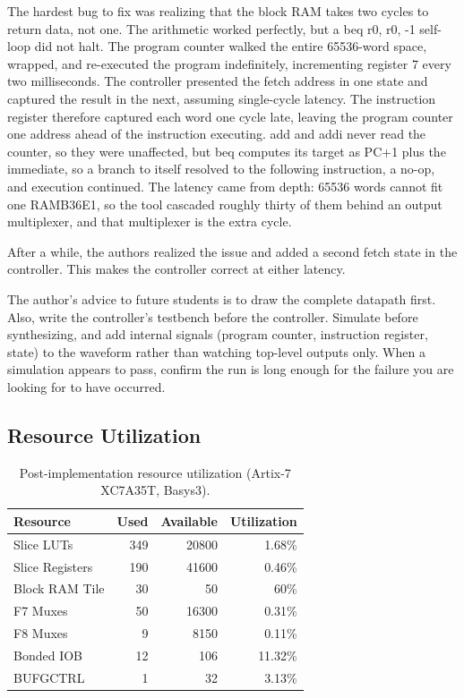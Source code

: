 \documentclass[11pt,letterpaper]{article}
\begin{document}
The hardest bug to fix was realizing that the block RAM takes two cycles to return data, not one. The arithmetic worked perfectly, but a beq r0, r0, -1 self-loop did not halt. The program counter walked the entire 65536-word space, wrapped, and re-executed the program indefinitely, incrementing register 7 every two milliseconds. The controller presented the fetch address in one state and captured the result in the next, assuming single-cycle latency. The instruction register therefore captured each word one cycle late, leaving the program counter one address ahead of the instruction executing. add and addi never read the counter, so they were unaffected, but beq computes its target as PC+1 plus the immediate, so a branch to itself resolved to the following instruction, a no-op, and execution continued. The latency came from depth: 65536 words cannot fit one RAMB36E1, so the tool cascaded roughly thirty of them behind an output multiplexer, and that multiplexer is the extra cycle.

After a while, the authors realized the issue and added a second fetch state in the controller. This makes the controller correct at either latency. 

The author's advice to future students is to draw the complete datapath first. Also, write the controller's testbench before the controller. Simulate before synthesizing, and add internal signals (program counter, instruction register, state) to the waveform rather than watching top-level outputs only. When a simulation appears to pass, confirm the run is long enough for the failure you are looking for to have occurred.

\subsection{Resource Utilization}
\begin{table}[H]
  \centering
  \begin{tabular}{@{}lrrr@{}}
    \toprule
    \textbf{Resource} & \textbf{Used} & \textbf{Available} & \textbf{Utilization} \\
    \midrule
    Slice LUTs      & 349 & 20800 & 1.68\% \\
    Slice Registers & 190 & 41600 & 0.46\% \\
    Block RAM Tile  & 30 & 50    & 60\% \\
    F7 Muxes        & 50 & 16300    & 0.31\% \\
    F8 Muxes        & 9  & 8150   & 0.11\% \\
    Bonded IOB      & 12 & 106   & 11.32\% \\
    BUFGCTRL        & 1 & 32    & 3.13\% \\
    \bottomrule
  \end{tabular}
  \caption{Post-implementation resource utilization (Artix-7 XC7A35T, Basys3).}
\end{table}
\end{document}
